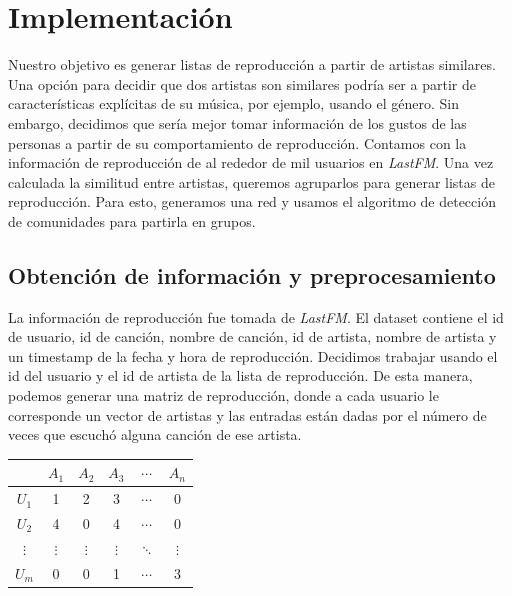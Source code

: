 \documentclass[conference]{IEEEtran}
\begin{document}
%
%
%



\section{Implementación}

Nuestro objetivo es generar listas de reproducción a partir de artistas similares. Una opción para decidir que dos artistas son similares podría ser a partir de características explícitas de su música, por ejemplo, usando el género. Sin embargo, decidimos que sería mejor tomar información de los gustos de las personas a partir de su comportamiento de reproducción. Contamos con la información de reproducción de al rededor de mil usuarios en \textit{LastFM}.
Una vez calculada la similitud entre artistas, queremos agruparlos para generar listas de reproducción. Para esto, generamos una red y usamos el algoritmo de detección de comunidades para partirla en grupos.

\subsection{Obtención de información y preprocesamiento}

La información de reproducción fue tomada de \textit{LastFM}. El dataset contiene el id de usuario, id de canción, nombre de canción, id de artista, nombre de artista y un timestamp de la fecha y hora de reproducción. Decidimos trabajar usando el id del usuario y el id de artista de la lista de reproducción. De esta manera, podemos generar una matriz de reproducción, donde a cada usuario le corresponde un vector de artistas y las entradas están dadas por el número de veces que escuchó alguna canción de ese artista.
\begin{center}
     \begin{tabular}{ c | c  c c c c}
         & $A_1$ & $A_2$ & $A_3$ & $\cdots$ & $A_n$ \\
       \hline                       
       $U_1$ &   1 &     2 &     3 & $\cdots$ &      0 \\
       $U_2$ &   4 &     0 &     4 & $\cdots$  &     0\\
       $\vdots$ & $\vdots$ & $\vdots$ & $\vdots$ & $\ddots$ & $\vdots$\\
       $U_m$ &   0 &     0 &     1 & $\cdots$ &      3\\
      \hline  
   \end{tabular}
\end{center}
\end{document}
